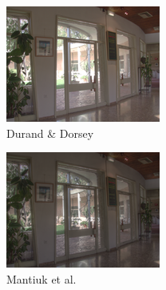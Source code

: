\begin{figure}
\begin{subfigure}[b]{0.33\textwidth}
    \includegraphics[width=\textwidth]{figures/chapter2/tmos44/44_durand02.png}
    \caption{Durand \& Dorsey~\cite{durand2002fast}}
\end{subfigure}\hfill
\begin{subfigure}[b]{0.33\textwidth}
    \centering
    \includegraphics[width=\textwidth]{figures/chapter2/tmos44/44_mantiuk06.png}
    \caption{Mantiuk et al.~\cite{mantiuk2006perceptual}}
\end{subfigure}\\
\begin{subfigure}[b]{0.33\textwidth}
    \centering

\end{subfigure}
\end{figure}
